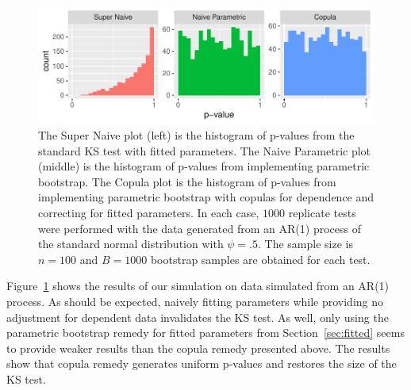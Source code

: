 \documentclass[12pt, letterpaper, titlepage]{article}
\begin{document}
\begin{figure}[tbp]
  \centering
  \includegraphics[width=\textwidth]{hist_ar1_FD}
  \caption{The Super Naive plot (left) is the histogram of p-values from the 
  standard KS test with fitted parameters. The Naive Parametric plot (middle) is
  the histogram of p-values from implementing parametric bootstrap. The Copula 
  plot is the histogram of p-values from implementing parametric bootstrap with 
  copulas for dependence and correcting for fitted parameters. In each case, 
  $1000$ replicate tests were performed with the data generated from an AR(1) 
  process of the standard normal distribution with $\psi = .5$. The sample size 
  is $n = 100$ and $B = 1000$ bootstrap samples are obtained for each test.}
  \label{fig:hist_ar1_FD}
\end{figure}

Figure~\ref{fig:hist_ar1_FD} shows the results of our simulation on data 
simulated from an AR(1) process. As should be expected, naively fitting 
parameters while providing no adjustment for dependent data invalidates the KS 
test. As well, only using the parametric bootstrap remedy for fitted parameters 
from Section~\ref{sec:fitted} seems to provide weaker results than the 
copula remedy presented above. The results show that copula remedy generates 
uniform p-values and restores the size of the KS test.
\end{document}
